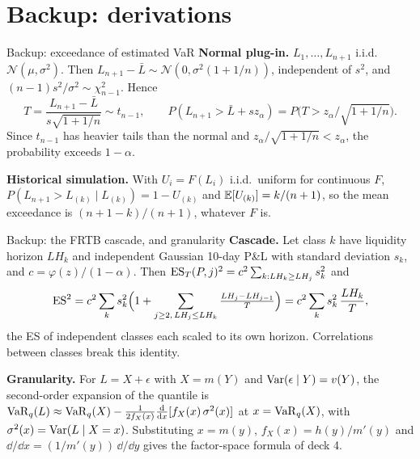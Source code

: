 \section{Backup: derivations}

\begin{frame}{Backup: exceedance of estimated VaR}
  \small
  \textbf{Normal plug-in.} $L_1,\dots,L_{n+1}$ i.i.d.\ $\mathcal N(\mu,\sigma^2)$. Then $L_{n+1} - \bar L \sim \mathcal N(0, \sigma^2(1 + 1/n))$, independent of $s^2$, and $(n-1)s^2/\sigma^2 \sim \chi^2_{n-1}$. Hence
  \[ T = \frac{L_{n+1} - \bar L}{s\sqrt{1 + 1/n}} \sim t_{n-1}, \qquad P(L_{n+1} > \bar L + s z_\alpha) = P\big(T > z_\alpha/\sqrt{1+1/n}\big). \]
  Since $t_{n-1}$ has heavier tails than the normal and $z_\alpha/\sqrt{1+1/n} < z_\alpha$, the probability exceeds $1-\alpha$.
  \vspace{0.4em}

  \textbf{Historical simulation.} With $U_i = F(L_i)$ i.i.d.\ uniform for continuous $F$, $P(L_{n+1} > L_{(k)} \mid L_{(k)}) = 1 - U_{(k)}$ and $\mathbb{E}[U_{(k)}] = k/(n+1)$, so the mean exceedance is $(n+1-k)/(n+1)$, whatever $F$ is.
\end{frame}

\begin{frame}{Backup: the FRTB cascade, and granularity}
  \small
  \textbf{Cascade.} Let class $k$ have liquidity horizon $LH_k$ and independent Gaussian 10-day P\&L with standard deviation $s_k$, and $c = \varphi(z)/(1-\alpha)$. Then $\mathrm{ES}_T(P,j)^2 = c^2\sum_{k: LH_k \ge LH_j}s_k^2$ and
  \[ \mathrm{ES}^2 = c^2\sum_k s_k^2\Big(1 + \sum_{j \ge 2,\,LH_j \le LH_k}\tfrac{LH_j - LH_{j-1}}{T}\Big) = c^2\sum_k s_k^2\,\frac{LH_k}{T}, \]
  the ES of independent classes each scaled to its own horizon. Correlations between classes break this identity.
  \vspace{0.3em}

  \textbf{Granularity.} For $L = X + \epsilon$ with $X = m(Y)$ and $\operatorname{Var}(\epsilon \mid Y) = v(Y)$, the second-order expansion of the quantile is $\mathrm{VaR}_q(L) \approx \mathrm{VaR}_q(X) - \frac{1}{2f_X(x)}\frac{\mathrm{d}}{\mathrm{d} x}[f_X(x)\,\sigma^2(x)]$ at $x = \mathrm{VaR}_q(X)$, with $\sigma^2(x) = \operatorname{Var}(L \mid X = x)$. Substituting $x = m(y)$, $f_X(x) = h(y)/m'(y)$ and $\dd/\dd x = (1/m'(y))\,\dd/\dd y$ gives the factor-space formula of deck 4.
\end{frame}

